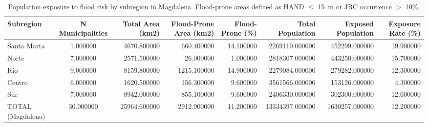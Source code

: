 \begin{table}[htbp]
\caption{Population exposure to flood risk by subregion in Magdalena. Flood-prone areas defined as HAND $\leq$ 15~m or JRC occurrence $>$ 10\%.}
\label{tab:population_exposure}
\begin{tabular}{lcrrrrrr}
\toprule
Subregion & N Municipalities & Total Area (km2) & Flood-Prone Area (km2) & Flood-Prone (\%) & Total Population & Exposed Population & Exposure Rate (\%) \\
\midrule
Santa Marta & 1.000000 & 4670.800000 & 660.400000 & 14.100000 & 2269110.000000 & 452299.000000 & 19.900000 \\
Norte & 7.000000 & 2571.500000 & 26.000000 & 1.000000 & 2818307.000000 & 443250.000000 & 15.700000 \\
Rio & 9.000000 & 8159.800000 & 1215.100000 & 14.900000 & 2279084.000000 & 279282.000000 & 12.300000 \\
Centro & 6.000000 & 1620.500000 & 156.300000 & 9.600000 & 3561566.000000 & 153126.000000 & 4.300000 \\
Sur & 7.000000 & 8942.000000 & 855.100000 & 9.600000 & 2406330.000000 & 302300.000000 & 12.600000 \\
TOTAL (Magdalena) & 30.000000 & 25964.600000 & 2912.900000 & 11.200000 & 13334397.000000 & 1630257.000000 & 12.200000 \\
\bottomrule
\end{tabular}
\end{table}
